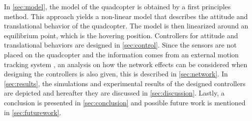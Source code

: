 In \autoref{sec:model}, the model of the quadcopter is obtained by a first principles method. This approach yields a non-linear model that describes the attitude and translational behavior of the quadcopter. The model is then linearized around an equilibrium point, which is the hovering position. 
%
Controllers for attitude and translational behaviors are designed in \autoref{sec:control}.%
%
Since the sensors are not placed on the quadcopter and the information comes from an external motion tracking system \cite{vicon}, an analysis on how the network effects can be considered when designing the controllers is also given, this is described in \autoref{sec:network}.
%
In \autoref{sec:results}, the simulations and experimental results of the designed controllers are depicted and hereafter they are discussed in \autoref{sec:discussion}. Lastly, a conclusion is presented in \autoref{sec:conclusion} and possible future work is mentioned in \autoref{sec:futurework}. %